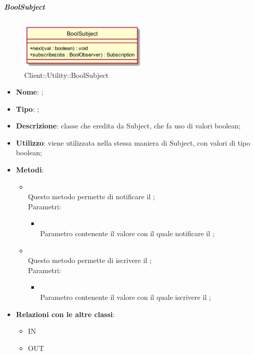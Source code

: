 \hypertarget{BoolSubject_label}{\subparagraph{BoolSubject}}
\begin{figure}[h]
	\centering
	\includegraphics[width=0.55\textwidth,height=\textheight,keepaspectratio]{images/ClassBoolSubject.png}
	\caption{Client::Utility::BoolSubject}
\end{figure}
\begin{itemize}
	\item \textbf{Nome}: ;
	\item \textbf{Tipo}: ;
	\item \textbf{Descrizione}: classe che eredita da Subject, che fa uso di valori boolean;
	\item \textbf{Utilizzo}: viene utilizzata nella stessa maniera di Subject, con valori di tipo boolean;
	\item \textbf{Metodi}:
	\begin{itemize}
		\item[]  \\		Questo metodo permette di notificare il ;\\
		Parametri:
		\begin{itemize}
			\item {} \\
			Parametro contenente il valore con il quale notificare il ;
		\end{itemize}
		\item[]  \\		Questo metodo permette di iscrivere il ;\\
		Parametri:
		\begin{itemize}
			\item {} \\
			Parametro contenente il valore con il quale iscrivere il ;
		\end{itemize}
	\end{itemize}
	\item \textbf{Relazioni con le altre classi}:
	\begin{itemize}
		\item IN \hyperlink{Player_label}{}
		\item OUT \hyperlink{BoolObserver_label}{}
	\end{itemize}
\end{itemize}
\FloatBarrier

